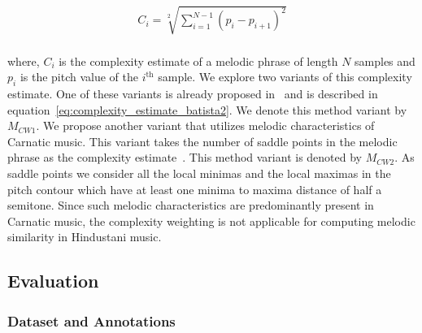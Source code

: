 \begin{equation}
\begin{gathered}
C_i = \sqrt[2]{\sum_{i=1}^{N-1} (p_{i}-p_{i+1})^2}\\
\end{gathered}
\label{eq:complexity_estimate_batista}
\end{equation}

\noindent where, $C_i$ is the complexity estimate of a melodic phrase of length $N$ samples and $p_i$ is the pitch value of the $i^{\mathrm{th}}$ sample. We explore two variants of this complexity estimate. One of these variants is already proposed in~\cite{batista2011complexity} and is described in equation~\ref{eq:complexity_estimate_batista2}. We denote this method variant by $M_{CW1}$. We propose another variant that utilizes melodic characteristics of Carnatic music. This variant takes the number of saddle points in the melodic phrase as the complexity estimate~\citep{Ishwar2013}. This method variant is denoted by $M_{CW2}$. As saddle points we consider all the local minimas and the local maximas in the pitch contour which have at least one minima to maxima distance of half a semitone. Since such melodic characteristics are predominantly present in Carnatic music, the complexity weighting is not applicable for computing melodic similarity in Hindustani music.


\subsection{Evaluation}
\label{sec:patterns_improving_similarity_evaluation}

\subsubsection{Dataset and Annotations}
\label{sec:patterns_improving_similarity_dataset_and_annotations}

